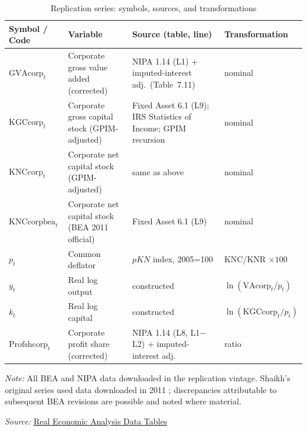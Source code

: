 \begin{table}[!ht]
\centering
\small
\setlength{\tabcolsep}{3pt}
\renewcommand{\arraystretch}{1.15}
\caption{Replication series: symbols, sources, and transformations}
\label{tab:app_glossary}
\begin{tabular}{@{} >{\raggedright\arraybackslash}p{}
 >{\raggedright\arraybackslash}p{}
 >{\raggedright\arraybackslash}p{}
 >{\raggedright\arraybackslash}p{}@{}}
\hline
Symbol / Code  & Variable  & Source (table, line)  & Transformation \\
\hline
$\text{GVAcorp}_t$
 & Corporate gross value added (corrected)
 & NIPA 1.14 (L1) + imputed-interest adj.\ (Table~7.11)
 & nominal \\[3pt]
$\text{KGCcorp}_t$
 & Corporate gross capital stock (GPIM-adjusted)
 & Fixed Asset 6.1 (L9); IRS Statistics of Income; GPIM recursion
 & nominal \\[3pt]
$\text{KNCcorp}_t$
 & Corporate net capital stock (GPIM-adjusted)
 & same as above
 & nominal \\[3pt]
$\text{KNCcorpbea}_t$
 & Corporate net capital stock (BEA 2011 official)
 & Fixed Asset 6.1 (L9)
 & nominal \\[3pt]
$p_t$
 & Common deflator
 & $pKN$ index, 2005=100
 & KNC/KNR $\times 100$ \\[3pt]
$y_t$
 & Real log output
 & constructed
 & $\ln(\text{VAcorp}_t/p_t)$ \\[3pt]
$k_t$
 & Real log capital
 & constructed
 & $\ln(\text{KGCcorp}_t/p_t)$ \\[3pt]
$\text{Profshcorp}_t$
 & Corporate profit share (corrected)
 & NIPA 1.14 (L8, L1$-$L2) + imputed-interest adj.
 & ratio \\
\hline
\end{tabular}
\par\vspace{0.4em}
\footnotesize\textit{Note:} All BEA and NIPA data downloaded in the replication vintage. Shaikh's original series used data downloaded in 2011 \citep[Appendix~6.7, fn.~1]{Shaikh2016}; discrepancies attributable to subsequent BEA revisions are possible and noted where material.
\par\vspace{0.2em}
\footnotesize \textit{Source:} \href{https://www.realecon.org/data}{Real Economic Analysis Data Tables}
\end{table}

